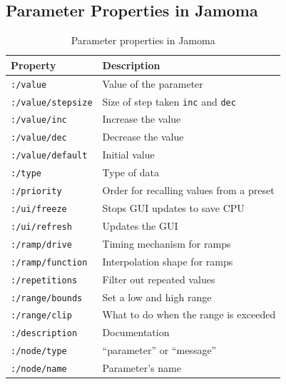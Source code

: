 \documentclass{article}
\begin{document}

\subsection{Parameter Properties in Jamoma} %


\begin{table}
\begin{center}
\footnotesize\noindent
\begin{tabular}{| l | p{4.5cm} |}
    \hline
    \textbf{Property}          & \textbf{Description}\\ 
	\hline
	\texttt{:/value}			& Value of the parameter \\
	\hline
	\texttt{:/value/stepsize}	& Size of step taken \texttt{inc} and \texttt{dec} \\
	\hline
	\texttt{:/value/inc}		& Increase the value \\
	\hline
	\texttt{:/value/dec}		& Decrease the value \\
	\hline
	\texttt{:/value/default}	& Initial value \\
	\hline
	\texttt{:/type} 			& Type of data \\
	\hline
	\texttt{:/priority} 		& Order for recalling values from a preset \\
	\hline
	\texttt{:/ui/freeze} 		& Stops GUI updates to save CPU \\
	\hline
	\texttt{:/ui/refresh} 		& Updates the GUI \\
	\hline
	\texttt{:/ramp/drive} 		& Timing mechanism for ramps \\
	\hline
	\texttt{:/ramp/function} 	& Interpolation shape for ramps \\
	\hline
	\texttt{:/repetitions} 		& Filter out repeated values \\
	\hline
	\texttt{:/range/bounds} 	& Set a low and high range \\
	\hline
	\texttt{:/range/clip} 		& What to do when the range is exceeded \\
	\hline
	\texttt{:/description} 		& Documentation \\
	\hline
	\texttt{:/node/type} 		& ``parameter'' or ``message'' \\
	\hline
	\texttt{:/node/name} 		& Parameter's name \\
	\hline
\end{tabular}
\end{center}
\caption{Parameter properties in Jamoma}
\label{tab:parameter_properties}
\end{table}
\end{document}
